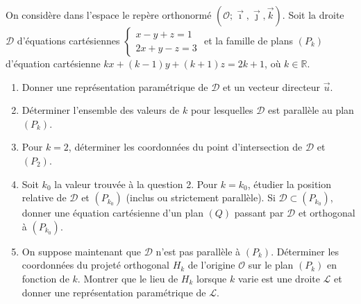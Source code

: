 \documentclass[11pt]{article}
\begin{document}
\begin{exercice}
On considère dans l'espace le repère orthonormé $(\mathcal{O};\vec{\imath},\vec{\jmath},\vec{k})$.
Soit la droite $\mathcal{D}$ d'équations cartésiennes $\begin{cases} x - y + z = 1 \\ 2x + y - z = 3 \end{cases}$ et la famille de plans $(P_k)$ d'équation cartésienne $kx + (k-1)y + (k+1)z = 2k+1$, où $k \in \mathbb{R}$.
\begin{enumerate}
    \item Donner une représentation paramétrique de $\mathcal{D}$ et un vecteur directeur $\vec{u}$.
    \item Déterminer l'ensemble des valeurs de $k$ pour lesquelles $\mathcal{D}$ est parallèle au plan $(P_k)$.
    \item Pour $k=2$, déterminer les coordonnées du point d'intersection de $\mathcal{D}$ et $(P_2)$.
    \item Soit $k_0$ la valeur trouvée à la question 2. Pour $k=k_0$, étudier la position relative de $\mathcal{D}$ et $(P_{k_0})$ (inclus ou strictement parallèle). Si $\mathcal{D} \subset (P_{k_0})$, donner une équation cartésienne d'un plan $(Q)$ passant par $\mathcal{D}$ et orthogonal à $(P_{k_0})$.
    \item On suppose maintenant que $\mathcal{D}$ n'est pas parallèle à $(P_k)$. Déterminer les coordonnées du projeté orthogonal $H_k$ de l'origine $\mathcal{O}$ sur le plan $(P_k)$ en fonction de $k$. Montrer que le lieu de $H_k$ lorsque $k$ varie est une droite $\mathcal{L}$ et donner une représentation paramétrique de $\mathcal{L}$.
\end{enumerate}
\end{exercice}
\end{document}
